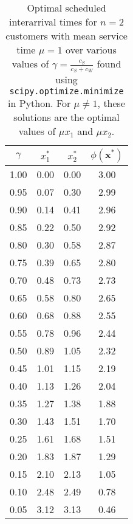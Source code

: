 \begin{table}[htb]
\centering
\begin{tabular}{|c|c|c|c|} \hline
 $\gamma$ &  $x_{1}^{*}$ &  $x_{2}^{*}$ &  $\phi (\mathbf{x}^{*})$ \\ \hline
     1.00 &     0.00 &     0.00 &                 3.00 \\
     0.95 &     0.07 &     0.30 &                 2.99 \\
     0.90 &     0.14 &     0.41 &                 2.96 \\
     0.85 &     0.22 &     0.50 &                 2.92 \\
     0.80 &     0.30 &     0.58 &                 2.87 \\
     0.75 &     0.39 &     0.65 &                 2.80 \\
     0.70 &     0.48 &     0.73 &                 2.73 \\
     0.65 &     0.58 &     0.80 &                 2.65 \\
     0.60 &     0.68 &     0.88 &                 2.55 \\
     0.55 &     0.78 &     0.96 &                 2.44 \\
     0.50 &     0.89 &     1.05 &                 2.32 \\
     0.45 &     1.01 &     1.15 &                 2.19 \\
     0.40 &     1.13 &     1.26 &                 2.04 \\
     0.35 &     1.27 &     1.38 &                 1.88 \\
     0.30 &     1.43 &     1.51 &                 1.70 \\
     0.25 &     1.61 &     1.68 &                 1.51 \\
     0.20 &     1.83 &     1.87 &                 1.29 \\
     0.15 &     2.10 &     2.13 &                 1.05 \\
     0.10 &     2.48 &     2.49 &                 0.78 \\
     0.05 &     3.12 &     3.13 &                 0.46 \\ \hline
\end{tabular}
\caption{Optimal scheduled interarrival times for $n = 2$ customers with mean service time $\mu = 1$ over various values of $\gamma = \frac{c_{S}}{c_{S} + c_{W}}$ found using \texttt{scipy.optimize.minimize} in Python. For $\mu \neq 1$, these solutions are the optimal values of $\mu x_{1}$ and $\mu x_{2}$.}
\label{Static_2_Cust_Pedgen}
\end{table}

